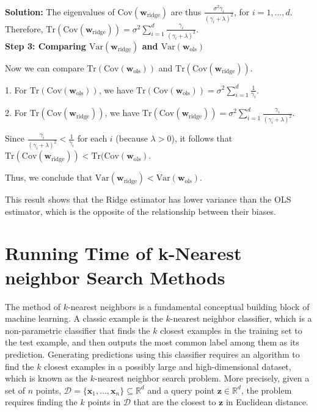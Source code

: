 \documentclass{article}
\newcommand{\Question}[1]{\Large \section{ #1 } \normalsize}
\renewcommand{\vec}[1]{\boldsymbol{\mathbf{#1}}}
\newenvironment{solution}{\color{blue} \smallskip \textbf{Solution:}}{}
\begin{document}
\begin{enumerate}[(a)]
\begin{solution}
The eigenvalues of \(\text{Cov}(\mathbf{w}_{\text{ridge}})\) are thus \(\frac{\sigma^2 \gamma_i}{(\gamma_i + \lambda)^2}\), for \(i = 1, \dots, d\). Therefore, \(\text{Tr}(\text{Cov}(\mathbf{w}_{\text{ridge}})) = \sigma^2 \sum_{i=1}^d \frac{\gamma_i}{(\gamma_i + \lambda)^2}\).\\

\textbf{Step 3: Comparing \(\text{Var}(\mathbf{w}_{\text{ridge}})\) and \(\text{Var}(\mathbf{w}_{\text{ols}})\)}

Now we can compare \(\text{Tr}(\text{Cov}(\mathbf{w}_{\text{ols}}))\) and \(\text{Tr}(\text{Cov}(\mathbf{w}_{\text{ridge}}))\).

1. For \(\text{Tr}(\text{Cov}(\mathbf{w}_{\text{ols}}))\), we have \(\text{Tr}(\text{Cov}(\mathbf{w}_{\text{ols}})) = \sigma^2 \sum_{i=1}^d \frac{1}{\gamma_i}\).

2. For \(\text{Tr}(\text{Cov}(\mathbf{w}_{\text{ridge}}))\), we have \(\text{Tr}(\text{Cov}(\mathbf{w}_{\text{ridge}})) = \sigma^2 \sum_{i=1}^d \frac{\gamma_i}{(\gamma_i + \lambda)^2}\).

Since \(\frac{\gamma_i}{(\gamma_i + \lambda)^2} < \frac{1}{\gamma_i}\) for each \(i\) (because \(\lambda > 0\)), it follows that \(\text{Tr}(\text{Cov}(\mathbf{w}_{\text{ridge}})) < \text{Tr}(\text{Cov}(\mathbf{w}_{\text{ols}})\).

Thus, we conclude that \(\text{Var}(\mathbf{w}_{\text{ridge}}) < \text{Var}(\mathbf{w}_{\text{ols}})\).

This result shows that the Ridge estimator has lower variance than the OLS estimator, which is the opposite of the relationship between their biases.




    \end{solution}
\end{enumerate}


\newpage
\Question{Running Time of k-Nearest neighbor Search Methods}

The method of $k$-nearest neighbors is a fundamental conceptual building block of machine learning. 
A classic example is the $k$-nearest neighbor classifier, which is a non-parametric classifier that finds the $k$ closest examples in the training set to the test example, and then outputs the most common label among them as its prediction. 
Generating predictions using this classifier requires an algorithm to find the $k$ closest examples in a possibly large and high-dimensional dataset, which is known as the $k$-nearest neighbor search problem. 
More precisely, given a set of $n$ points, $\mathcal{D} = \{\vec{x}_{1}, \ldots, \vec{x}_{n}\} \subseteq \mathbb{R}^{d}$ and a query point $\vec{z} \in \mathbb{R}^{d}$, the problem requires finding the $k$ points in $\mathcal{D}$ that are the closest to $\vec{z}$ in Euclidean distance.
\end{document}
